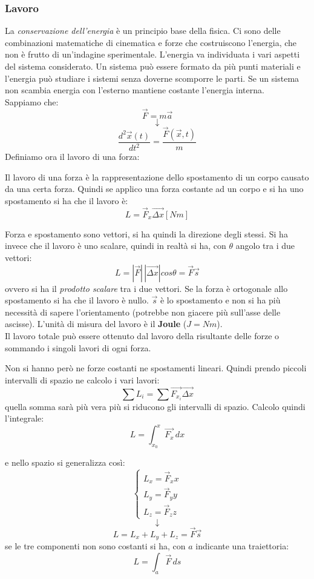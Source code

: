 \documentclass[a4paper,12pt, oneside]{book}
\begin{document}
\subsubsection{Lavoro}
La \textit{conservazione dell'energia} è un principio base della fisica. Ci sono delle combinazioni matematiche di cinematica e forze che costruiscono l'energia, che non è frutto di un'indagine sperimentale. L'energia va individuata i vari aspetti del sistema considerato. Un sistema può essere formato da più punti materiali e l'energia può studiare i sistemi senza doverne scomporre le parti. Se un sistema non scambia energia con l'esterno mantiene costante l'energia interna.\\
Sappiamo che:
$$\vec{F}=m\vec{a}$$
$$\downarrow$$
$$\frac{d^2\vec{x}(t)}{dt^2}=\frac{\vec{F}(\vec{x},t)}{m}$$
Definiamo ora il lavoro di una forza:
\begin{definizione}
	Il lavoro di una forza è la rappresentazione dello spostamento di un corpo causato da una certa forza. Quindi se applico una forza costante ad un corpo e si ha uno spostamento si ha che il lavoro è:
	$$L=\vec{F}_x\vec{\Delta x}[Nm]$$

	Forza e spostamento sono vettori, si ha quindi la direzione degli stessi. Si ha invece che il lavoro è uno scalare, quindi in realtà si ha, con $\theta$ angolo tra i due vettori:
	$$L=|\vec{F}|\,|\vec{\Delta x}|cos\theta=\vec{F}\vec{s}$$
	ovvero si ha il \textit{prodotto scalare} tra i due vettori. Se la forza è ortogonale allo spostamento si ha che il lavoro è nullo. $\vec{s}$ è lo spostamento e non si ha più necessità di sapere l'orientamento (potrebbe non giacere più sull'asse  delle ascisse). L'unità di misura del lavoro è il \textbf{Joule} ($J=Nm$). \\
	Il lavoro totale può essere ottenuto dal lavoro della risultante delle forze o sommando i singoli lavori di ogni forza.
\end{definizione}
Non si hanno però ne forze costanti ne spostamenti lineari. Quindi prendo piccoli intervalli di spazio ne calcolo i vari lavori:
$$\sum	L_i= \sum \vec{F_{x_i}}\vec{\Delta x}$$
quella somma sarà più vera più si riducono gli intervalli di spazio. Calcolo quindi l'integrale:
$$L=\int_{x_0}^x \vec{F_x}\,dx$$

e nello spazio si generalizza così:
$$
	\begin{cases}
		L_x=\vec{F}_x x \\
		L_y=\vec{F}_y y \\
		L_z=\vec{F}_z z
	\end{cases}$$
$$\downarrow$$
$$L=L_x+L_y+L_z=\vec{F}\vec{s}$$
se le tre componenti non sono costanti si ha, con $a$ indicante una traiettoria:
$$L=\int_a \vec{F}\, ds$$
\end{document}

